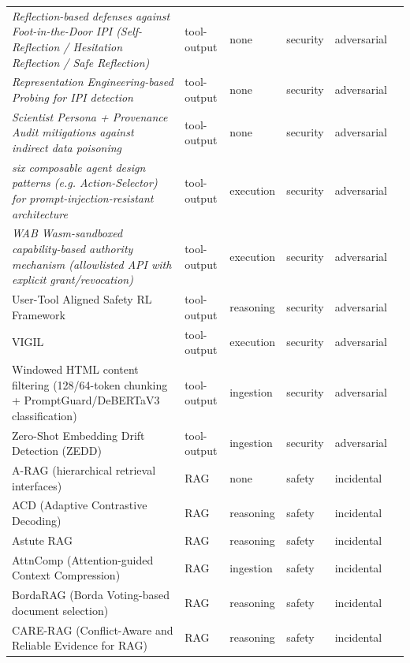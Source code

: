 \begin{longtable}{@{}p{}lllll@{}}
\emph{Reflection-based defenses against Foot-in-the-Door IPI (Self-Reflection / Hesitation Reflection / Safe Reflection)} & tool-output & none & security & adversarial & \cite{nakash-2024-breaking} \\
\emph{Representation Engineering-based Probing for IPI detection} & tool-output & none & security & adversarial & \cite{zhu-2026-your} \\
\emph{Scientist Persona + Provenance Audit mitigations against indirect data poisoning} & tool-output & none & security & adversarial & \cite{gyevnar-2026-distributed} \\
\emph{six composable agent design patterns (e.g. Action-Selector) for prompt-injection-resistant architecture} & tool-output & execution & security & adversarial & \cite{beurerkellner-2025-design} \\
\emph{WAB Wasm-sandboxed capability-based authority mechanism (allowlisted API with explicit grant/revocation)} & tool-output & execution & security & adversarial & \cite{liu-2026-wab} \\
User-Tool Aligned Safety RL Framework & tool-output & reasoning & security & adversarial & \cite{sha-2025-agent} \\
VIGIL & tool-output & execution & security & adversarial & \cite{lin-2026-vigil} \\
Windowed HTML content filtering (128/64-token chunking + PromptGuard/DeBERTaV3 classification) & tool-output & ingestion & security & adversarial & \cite{dinu-2025-disrupting} \\
Zero-Shot Embedding Drift Detection (ZEDD) & tool-output & ingestion & security & adversarial & \cite{sekar-2026-zeroshot} \\
A-RAG (hierarchical retrieval interfaces) & RAG & none & safety & incidental & \cite{du-2026-arag} \\
ACD (Adaptive Contrastive Decoding) & RAG & reasoning & safety & incidental & \cite{kim-2024-adaptive} \\
Astute RAG & RAG & reasoning & safety & incidental & \cite{wang-2024-astute} \\
AttnComp (Attention-guided Context Compression) & RAG & ingestion & safety & incidental & \cite{luo-2025-attncomp} \\
BordaRAG (Borda Voting-based document selection) & RAG & reasoning & safety & incidental & \cite{li-2025-bordarag} \\
CARE-RAG (Conflict-Aware and Reliable Evidence for RAG) & RAG & reasoning & safety & incidental & \cite{chen-2025-rethinking} \\

\end{longtable}
